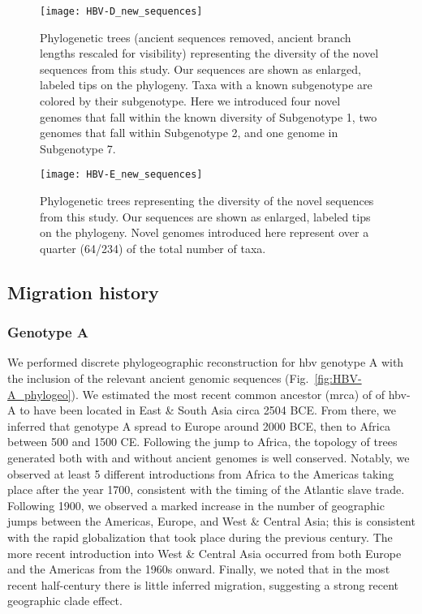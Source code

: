 \begin{figure}[ht]
  \centering
  \medskip
  \texttt{[image: HBV-D\_new\_sequences]}
  \caption[HBV-D New sequences]{Phylogenetic trees (ancient sequences removed, ancient branch lengths rescaled for visibility) representing the diversity of the novel sequences from this study. Our sequences are shown as enlarged, labeled tips on the phylogeny. Taxa with a known subgenotype are colored by their subgenotype. Here we introduced four novel genomes that fall within the known diversity of Subgenotype 1, two genomes that fall within Subgenotype 2, and one genome in Subgenotype 7.}
  \label{fig:HBV-D_new_sequences}
\end{figure}

\begin{figure}[ht]
  \centering
  \medskip
  \texttt{[image: HBV-E\_new\_sequences]}
  \caption[HBV-E New sequences]{Phylogenetic trees representing the diversity of the novel sequences from this study. Our sequences are shown as enlarged, labeled tips on the phylogeny. Novel genomes introduced here represent over a quarter (64/234) of the total number of taxa.}
  \label{fig:HBV-E_new_sequences}
\end{figure}

\subsection{Migration history}

\subsubsection{Genotype A}

We performed discrete phylogeographic reconstruction for \gls{hbv} genotype A with the inclusion of the relevant ancient genomic sequences (Fig.~\ref{fig:HBV-A_phylogeo}).
We estimated the most recent common ancestor (\gls{mrca}) of of \gls{hbv}-A to have been located in East \& South Asia circa 2504 BCE.
From there, we inferred that genotype A spread to Europe around 2000 BCE, then to Africa between 500 and 1500 CE.
Following the jump to Africa, the topology of trees generated both with and without ancient genomes is well conserved.
Notably, we observed at least 5 different introductions from Africa to the Americas taking place after the year 1700, consistent with the timing of the Atlantic slave trade.
Following 1900, we observed a marked increase in the number of geographic jumps between the Americas, Europe, and West \& Central Asia; this is consistent with the rapid globalization that took place during the previous century.
The more recent introduction into West \& Central Asia occurred from both Europe and the Americas from the 1960s onward.
Finally, we noted that in the most recent half-century there is little inferred migration, suggesting a strong recent geographic clade effect.

